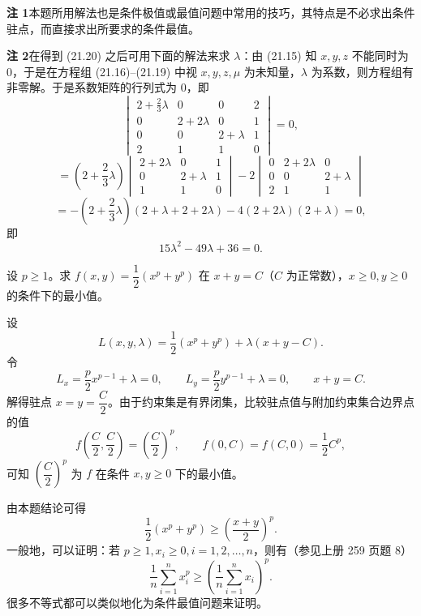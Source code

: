 \begin{xremark}
\textbf{注 1}\quad 本题所用解法也是条件极值或最值问题中常用的技巧，其特点是不必求出条件驻点，而直接求出所要求的条件最值。

\textbf{注 2}\quad 在得到 (21.20) 之后可用下面的解法来求 $\lambda$：由 (21.15) 知 $x,y,z$ 不能同时为 $0$，于是在方程组 (21.16)--(21.19) 中视 $x,y,z,\mu$ 为未知量，$\lambda$ 为系数，则方程组有非零解。于是系数矩阵的行列式为 $0$，即
\[
\begin{vmatrix}
2+\frac23\lambda&0&0&2\\
0&2+2\lambda&0&1\\
0&0&2+\lambda&1\\
2&1&1&0
\end{vmatrix}=0,
\]
\[
=\left(2+\frac23\lambda\right)
\begin{vmatrix}2+2\lambda&0&1\\0&2+\lambda&1\\1&1&0\end{vmatrix}
-2\begin{vmatrix}0&2+2\lambda&0\\0&0&2+\lambda\\2&1&1\end{vmatrix}
\]
\[
=-\left(2+\frac23\lambda\right)(2+\lambda+2+2\lambda)-4(2+2\lambda)(2+\lambda)=0,
\]
即
\[
  15\lambda^2-49\lambda+36=0.
\]
\end{xremark}

\begin{xexample}[21.4.3]
设 $p\ge1$。求 $f(x,y)=\dfrac12(x^p+y^p)$ 在 $x+y=C$（$C$ 为正常数），$x\ge0,y\ge0$ 的条件下的最小值。
\end{xexample}
\begin{xsolution}
设
\[
  L(x,y,\lambda)=\frac12(x^p+y^p)+\lambda(x+y-C).
\]
令
\[
  L_x=\frac p2x^{p-1}+\lambda=0,
  \qquad
  L_y=\frac p2y^{p-1}+\lambda=0,
  \qquad
  x+y=C.
\]
解得驻点 $x=y=\dfrac C2$。由于约束集是有界闭集，比较驻点值与附加约束集合边界点的值
\[
  f\left(\frac C2,\frac C2\right)=\left(\frac C2\right)^p,
  \qquad
  f(0,C)=f(C,0)=\frac12C^p,
\]
可知 $\left(\dfrac C2\right)^p$ 为 $f$ 在条件 $x,y\ge0$ 下的最小值。
\end{xsolution}
\begin{xremark}
由本题结论可得
\[
  \frac12(x^p+y^p)\ge\left(\frac{x+y}{2}\right)^p.
\]
一般地，可以证明：若 $p\ge1,x_i\ge0,i=1,2,\ldots,n$，则有（参见上册 259 页题 8）
\[
  \frac1n\sum_{i=1}^n x_i^p\ge\left(\frac1n\sum_{i=1}^n x_i\right)^p.
\]
很多不等式都可以类似地化为条件最值问题来证明。
\end{xremark}

